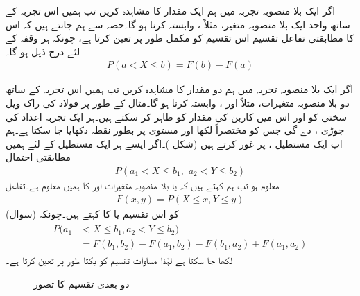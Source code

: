 اگر ایک بلا منصوبہ تجربہ میں ہم ایک مقدار کا مشاہدہ کریں تب ہمیں اس تجربہ کے ساتھ واحد ایک بلا منصوبہ متغیر، مثلاً ، وابستہ کرنا ہو گا۔حصہ  سے ہم جانتے ہیں کہ اس کا مطابقتی تفاعل تقسیم  اس تقسیم کو مکمل طور پر تعین کرتا ہے، چونکہ ہر وقفہ  کے لئے درج ذیل ہو گا۔
\begin{align*}
P(a<X\le b)=F(b)-F(a)
\end{align*}

اگر ایک بلا منصوبہ تجربہ میں ہم دو مقدار کا مشاہدہ کریں تب ہمیں اس تجربہ کے ساتھ دو بلا منصوبہ متغیرات، مثلاً  اور ، وابستہ کرنا ہو گا۔مثال کے طور پر فولاد کی راک ویل سختی کو    اور اس میں کاربن کی مقدار کو  ظاہر کر سکتے ہیں۔ہر ایک تجربہ اعداد کی جوڑی ،  دے گی جس کو مختصراً  لکھا اور  مستوی پر بطور نقطہ دکھایا جا سکتا ہے۔ہم اب ایک مستطیل ،  پر غور کرتے ہیں (شکل )۔اگر ایسے ہر ایک مستطیل کے لئے  ہمیں مطابقتی احتمال
\begin{align*}
P(a_1<X\le b_1,\,\, a_2<Y\le b_2)
\end{align*}
معلوم ہو تب ہم کہتے ہیں کہ   یا بلا منصوبہ متغیرات  اور  کا  ہمیں معلوم ہے۔تفاعل
\begin{align}\label{مساوات_شماریات_ایک_سے_زائد_الف}
F(x,y)=P(X\le x,Y\le y)
\end{align}
کو اس تقسیم یا  کا  کہتے ہیں۔چونکہ (سوال)
\begin{gather}
\begin{aligned}
P(a_1&<X\le b_1,a_2<Y\le b_2)\\
&=F(b_1,b_2)-F(a_1,b_2)-F(b_1,a_2)+F(a_1,a_2)
\end{aligned}
\end{gather}
لکھا جا سکتا ہے لہٰذا مساوات  تقسیم کو یکتا طور پر تعین کرتا ہے۔
\begin{figure}
\centering
{}
\caption{دو بعدی تقسیم کا تصور}
\label{شکل_شماریات_دو_بعدی_تقسیم}
\end{figure}

